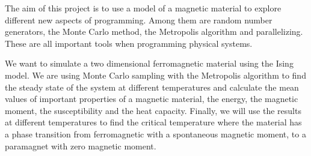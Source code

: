 The aim of this project is to use a model of a magnetic material to explore different new aspects of programming. Among them are random number generators, the Monte Carlo method, the Metropolis algorithm and parallelizing. These are all important tools when programming physical systems.

We want to simulate a two dimensional ferromagnetic material using the Ising model. We are using Monte Carlo sampling with the Metropolis algorithm to find the steady state of the system at different temperatures and calculate the mean values of important properties of a magnetic material, the energy, the magnetic moment, the susceptibility and the heat capacity. Finally, we will use the results at different temperatures to find the critical temperature where the material has a phase transition from ferromagnetic with a spontaneous magnetic moment, to a paramagnet with zero magnetic moment. 